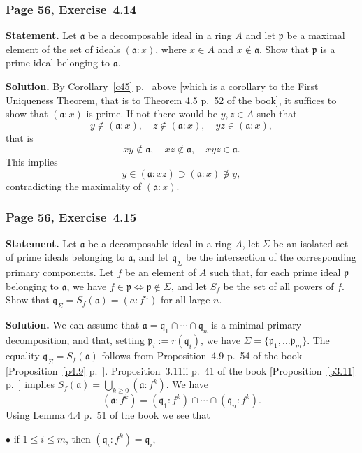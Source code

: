 \documentclass[12pt,letterpaper]{article}%
\newcommand{\mf}{\mathfrak}
\newcommand{\aaa}{\mf a}
\newcommand{\ppp}{\mf p}
\newcommand{\qqq}{\mf q}
\newcommand{\bu}{\bullet}
\newcommand{\nn}{\noindent}
\begin{document}
\subsubsection{Page 56, Exercise~4.14}%

\textbf{Statement.} Let $\aaa$ be a decomposable ideal in a ring $A$ and let $\ppp$ be a maximal element of the set of ideals $(\aaa:x)$, where $x\in A$ and $x\notin\aaa$. Show that $\ppp$ is a prime ideal belonging to $\aaa$.

\nn\textbf{Solution.} By Corollary~\ref{c45} p.~\pageref{c45} above [which is a corollary to the First Uniqueness Theorem, that is to Theorem 4.5 p.~52 of the book], it suffices to show that $(\aaa:x)$ is prime. If not there would be $y,z\in A$ such that 
$$
y\notin(\aaa:x),\quad z\notin(\aaa:x),\quad yz\in(\aaa:x),
$$ 
that is 
$$
xy\notin\aaa,\quad xz\notin\aaa,\quad xyz\in\aaa.
$$ 
This implies 
$$
y\in(\aaa:xz)\supset(\aaa:x)\not\ni y,
$$ 
contradicting the maximality of $(\aaa:x)$. 

\subsubsection{Page 56, Exercise~4.15}%

\textbf{Statement.} Let $\aaa$ be a decomposable ideal in a ring $A$, let $\Sigma$ be an isolated set of prime ideals belonging to $\aaa$, and let $\qqq_\Sigma$ be the intersection of the corresponding primary components. Let $f$ be an element of $A$ such that, for each prime ideal $\ppp$ belonging to $\aaa$, we have $f\in\ppp\iff\ppp\notin\Sigma$, and let $S_f$ be the set of all powers of $f$. Show that $\qqq_\Sigma=S_f(\aaa)=(a:f^n)$ for all large $n$.

\nn\textbf{Solution.} We can assume that $\aaa=\qqq_1\cap\cdots\cap\qqq_n$ is a minimal primary decomposition, and that, setting $\ppp_i:=r(\qqq_i)$, we have $\Sigma=\{\ppp_1,\dots\ppp_m\}$. The equality $\qqq_\Sigma=S_f(\aaa)$ follows from Proposition~4.9 p.~54 of the book [Proposition~\ref{p4.9} p.~\pageref{p4.9}]. Proposition~3.11ii p.~41 of the book [Proposition~\ref{p3.11} p.~\pageref{p3.11}] implies $S_f(\aaa)=\bigcup_{k\ge0}(\aaa:f^k)$. We have 
\begin{equation}\label{afk}
(\aaa:f^k)=(\qqq_1:f^k)\cap\cdots\cap(\qqq_n:f^k).
\end{equation} 
Using Lemma 4.4 p.~51 of the book we see that  

\nn$\bu$ if $1\le i\le m$, then $(\qqq_i:f^k)=\qqq_i$,  
\end{document}
